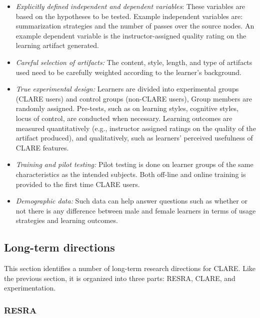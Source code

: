 \begin{itemize}
\item {\it Explicitly defined independent and dependent variables}: These
  variables are based on the hypotheses to be tested. Example independent
  variables are: summarization strategies and the number of passes over the
  source nodes. An example dependent variable is the instructor-assigned
  quality rating on the learning artifact generated.
  
\item {\it Careful selection of artifacts:\/} The content, style, length,
  and type of artifacts used need to be carefully weighted according to the
  learner's background.
  
\item {\it True experimental design:\/} Learners are divided into
  experimental groups (CLARE users) and control groups (non-CLARE users),
  Group members are randomly assigned. Pre-tests, such as on learning
  styles, cognitive styles, locus of control, are conducted when necessary.
  Learning outcomes are measured quantitatively (e.g., instructor assigned
  ratings on the quality of the artifact produced), and qualitatively,
  such as learners' perceived usefulness of CLARE features.
  
\item {\it Training and pilot testing:} Pilot testing is done on
  learner groups of the same characteristics as the intended subjects.
  Both off-line and online training is provided to the first time CLARE
  users.

\item {\it Demographic data:} Such data can help answer questions such
  as whether or not there is any difference between male and female
  learners in terms of usage strategies and learning outcomes.
\end{itemize}


\subsection{Long-term directions}

This section identifies a number of long-term research directions for
CLARE. Like the previous section, it is organized into three parts: 
RESRA, CLARE, and experimentation.


\subsubsection{RESRA}

